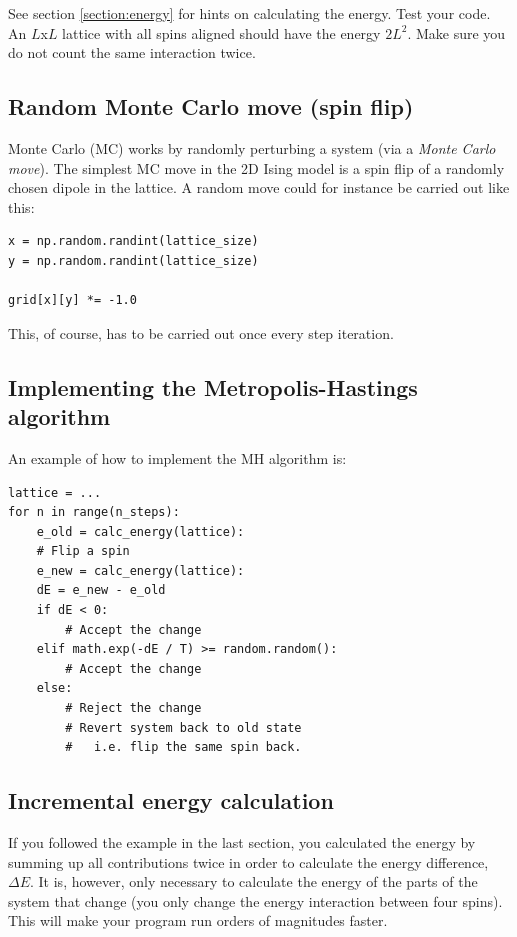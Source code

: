 \documentclass{article}
\begin{document}
See section \ref{section:energy} for hints on calculating the energy.
Test your code.
An $L$x$L$ lattice with all spins aligned should have the energy $2L^2$.
Make sure you do not count the same interaction twice.\\

\subsection{Random Monte Carlo move (spin flip)}

Monte Carlo (MC) works by randomly perturbing a system (via a \textit{Monte Carlo move}).
The simplest MC move in the 2D Ising model is a spin flip of a randomly chosen dipole in the lattice.
A random move could for instance be carried out like this:

\begin{lstlisting}
x = np.random.randint(lattice_size)
y = np.random.randint(lattice_size)

grid[x][y] *= -1.0
\end{lstlisting}

This, of course, has to be carried out once every step iteration.

\subsection{Implementing the Metropolis-Hastings algorithm}

An example of how to implement the MH algorithm is: 

\begin{lstlisting}
lattice = ...
for n in range(n_steps):
    e_old = calc_energy(lattice):
    # Flip a spin
    e_new = calc_energy(lattice):
    dE = e_new - e_old
    if dE < 0:
        # Accept the change
    elif math.exp(-dE / T) >= random.random():
        # Accept the change
    else:
        # Reject the change
        # Revert system back to old state
        #   i.e. flip the same spin back.
\end{lstlisting}

\subsection{Incremental energy calculation}

If you followed the example in the last section, you calculated the energy by summing up all contributions twice in order to calculate the energy difference, $\Delta E$.
It is, however, only necessary to calculate the energy of the parts of the system that change (you only change the energy interaction between four spins).
This will make your program run orders of magnitudes faster.\\
\end{document}
